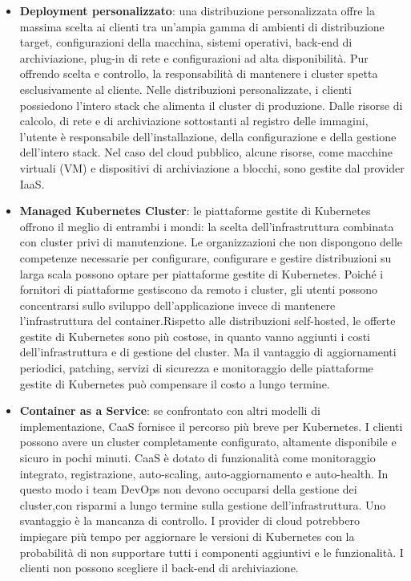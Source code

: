 \documentclass[12pt, a4paper]{report}
\begin{document}
\begin{itemize}
  \item  \textbf{Deployment personalizzato}: una distribuzione personalizzata offre la massima scelta ai clienti tra un'ampia gamma di ambienti di distribuzione target, configurazioni della macchina, sistemi operativi, back-end di archiviazione, plug-in di rete e configurazioni ad alta disponibilità. Pur offrendo scelta e controllo, la responsabilità di mantenere i cluster spetta esclusivamente al cliente.
  Nelle distribuzioni personalizzate, i clienti possiedono l'intero stack che alimenta il cluster di produzione. Dalle risorse di calcolo, di rete e di archiviazione sottostanti al registro delle immagini, l'utente è responsabile dell'installazione, della configurazione e della gestione dell'intero stack. Nel caso del cloud pubblico, alcune risorse, come macchine virtuali (VM) e dispositivi di archiviazione a blocchi, sono gestite dal provider IaaS.
  \item \textbf{Managed Kubernetes Cluster}: le piattaforme gestite di Kubernetes offrono il meglio di entrambi i mondi: la scelta dell'infrastruttura combinata con cluster privi di manutenzione. Le organizzazioni che non dispongono delle competenze necessarie per configurare, configurare e gestire distribuzioni su larga scala possono optare per piattaforme gestite di Kubernetes. Poiché i fornitori di piattaforme gestiscono da remoto i cluster, gli utenti possono concentrarsi sullo sviluppo dell'applicazione invece di mantenere l'infrastruttura del container.Rispetto alle distribuzioni self-hosted, le offerte gestite di Kubernetes sono più costose, in quanto vanno aggiunti i costi dell'infrastruttura e di gestione del cluster. Ma il vantaggio di aggiornamenti periodici, patching, servizi di sicurezza e monitoraggio delle piattaforme gestite di Kubernetes può compensare il costo a lungo termine.
  \item \textbf{Container as a Service}: se confrontato con altri modelli di implementazione, CaaS fornisce il percorso più breve per Kubernetes. I clienti possono avere un cluster completamente configurato, altamente disponibile e sicuro in pochi minuti. CaaS è dotato di funzionalità come monitoraggio integrato, registrazione, auto-scaling, auto-aggiornamento e auto-health. In questo modo i team DevOps non devono occuparsi della gestione dei cluster,con risparmi a lungo termine sulla gestione dell'infrastruttura. Uno svantaggio è la mancanza di controllo. I provider di cloud potrebbero impiegare più tempo per aggiornare le versioni di Kubernetes con la probabilità di non supportare tutti i componenti aggiuntivi e le funzionalità. I clienti non possono scegliere il back-end di archiviazione.

\end{itemize}
\end{document}

